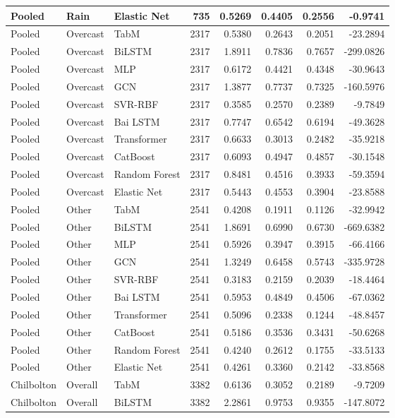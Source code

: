 \begin{longtable}{lllrrrrr}
Pooled & Rain & Elastic Net & 735 & 0.5269 & 0.4405 & 0.2556 & -0.9741 \\
\midrule
Pooled & Overcast & TabM & 2317 & 0.5380 & 0.2643 & 0.2051 & -23.2894 \\
Pooled & Overcast & BiLSTM & 2317 & 1.8911 & 0.7836 & 0.7657 & -299.0826 \\
Pooled & Overcast & MLP & 2317 & 0.6172 & 0.4421 & 0.4348 & -30.9643 \\
Pooled & Overcast & GCN & 2317 & 1.3877 & 0.7737 & 0.7325 & -160.5976 \\
Pooled & Overcast & SVR-RBF & 2317 & 0.3585 & 0.2570 & 0.2389 & -9.7849 \\
Pooled & Overcast & Bai LSTM & 2317 & 0.7747 & 0.6542 & 0.6194 & -49.3628 \\
Pooled & Overcast & Transformer & 2317 & 0.6633 & 0.3013 & 0.2482 & -35.9218 \\
Pooled & Overcast & CatBoost & 2317 & 0.6093 & 0.4947 & 0.4857 & -30.1548 \\
Pooled & Overcast & Random Forest & 2317 & 0.8481 & 0.4516 & 0.3933 & -59.3594 \\
Pooled & Overcast & Elastic Net & 2317 & 0.5443 & 0.4553 & 0.3904 & -23.8588 \\
\midrule
Pooled & Other & TabM & 2541 & 0.4208 & 0.1911 & 0.1126 & -32.9942 \\
Pooled & Other & BiLSTM & 2541 & 1.8691 & 0.6990 & 0.6730 & -669.6382 \\
Pooled & Other & MLP & 2541 & 0.5926 & 0.3947 & 0.3915 & -66.4166 \\
Pooled & Other & GCN & 2541 & 1.3249 & 0.6458 & 0.5743 & -335.9728 \\
Pooled & Other & SVR-RBF & 2541 & 0.3183 & 0.2159 & 0.2039 & -18.4464 \\
Pooled & Other & Bai LSTM & 2541 & 0.5953 & 0.4849 & 0.4506 & -67.0362 \\
Pooled & Other & Transformer & 2541 & 0.5096 & 0.2338 & 0.1244 & -48.8457 \\
Pooled & Other & CatBoost & 2541 & 0.5186 & 0.3536 & 0.3431 & -50.6268 \\
Pooled & Other & Random Forest & 2541 & 0.4240 & 0.2612 & 0.1755 & -33.5133 \\
Pooled & Other & Elastic Net & 2541 & 0.4261 & 0.3360 & 0.2142 & -33.8568 \\
\midrule
Chilbolton & Overall & TabM & 3382 & 0.6136 & 0.3052 & 0.2189 & -9.7209 \\
Chilbolton & Overall & BiLSTM & 3382 & 2.2861 & 0.9753 & 0.9355 & -147.8072 \\

\end{longtable}
